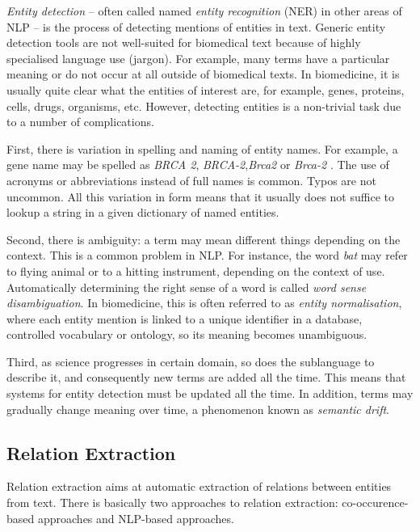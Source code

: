 \emph{Entity detection} -- often called named \emph{entity recognition} (NER) in other areas of NLP -- is the process of detecting mentions of entities in text.
Generic entity detection tools are not well-suited for biomedical text because of highly specialised language use (jargon). 
For example, many terms have a particular meaning or do not occur at all outside of biomedical texts.
In biomedicine, it is usually quite clear what the entities of interest are, for example, genes, proteins, cells, drugs, organisms, etc.
However, detecting entities is a non-trivial task due to a number of complications.

First, there is variation in spelling and naming of entity names.
For example, a gene name may be spelled as \emph{BRCA 2},\emph{ BRCA-2},\emph{Brca2} or \emph{Brca-2} \citep{Krallinger2010Analysis}.
The use of acronyms or abbreviations instead of full names is common. 
Typos are not uncommon.
All this variation in form means that it usually does not suffice to lookup a string in a given dictionary of named entities.

Second, there is ambiguity: a term may mean different things depending on the context.
This is a common problem in NLP.
For instance, the word \emph{bat} may refer to flying animal or to a hitting instrument, depending on the context of use.
Automatically determining the right sense of a word is called \emph{word sense disambiguation}.
In biomedicine, this is often referred to as \emph{entity normalisation}, where each entity mention is linked to a unique identifier in a database, controlled vocabulary or ontology, so its meaning becomes unambiguous. 
 
Third, as science progresses in certain domain, so does the sublanguage to describe it, and consequently new terms are added all the time.
This means that systems for entity detection must be updated all the time. 
In addition, terms may gradually change meaning over time, a phenomenon known as \emph{semantic drift}.

\subsection{Relation Extraction}   

Relation extraction aims at automatic extraction of relations between entities from text.
There is basically two approaches to relation extraction: co-occurence-based approaches and NLP-based approaches.

